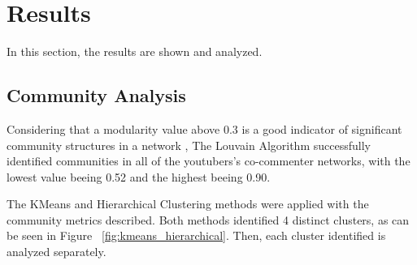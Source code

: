 \documentclass[12pt]{article}
\begin{document}
\section{Results}

In this section, the results are shown and analyzed.

\subsection{Community Analysis}

Considering that a modularity value above 0.3 is a good indicator of significant
community structures in a network \cite{PhysRevE.70.066111}, The Louvain Algorithm successfully 
identified communities in all of the youtubers's co-commenter networks, with the lowest value beeing
0.52 and the highest beeing 0.90. 

The KMeans and Hierarchical Clustering methods were applied with the community metrics described. 
Both methods identified 4 distinct clusters, as can be seen in Figure ~\ref{fig:kmeans_hierarchical}.
Then, each cluster identified is analyzed separately.
\end{document}
